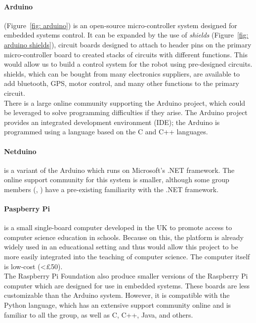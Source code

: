         \paragraph{\gls{Arduino}} (Figure~\ref{fig: arduino}) is an open-source micro-controller system designed for embedded systems control. It can be expanded by the use of \emph{\glspl{shield}} (Figure~\ref{fig: arduino shields}), circuit boards designed to attach to header pins on the primary micro-controller board to created stacks of circuits with different functions. This would allow us to build a control system for the robot using pre-designed circuits. \Glspl{shield}, which can be bought from many electronics suppliers, are available to add bluetooth, GPS, motor control, and many other functions to the primary circuit.\\
        There is a large online community supporting the \gls{Arduino} project, which could be leveraged to solve programming difficulties if they arise. The \gls{Arduino} project provides an integrated development environment (IDE); the \gls{Arduino} is programmed using a language based on the C and C++ languages.
        \paragraph{Netduino} is a variant of the \gls{Arduino} which runs on Microsoft's .NET framework. The online support community for this system is smaller, although some group members (\AG, \LY) have a pre-existing familiarity with the .NET framework.\\

        \paragraph{Paspberry Pi}is a small single-board computer developed in the UK to promote access to computer science education in schools. Because on this, the platform is already widely used in an educational setting and thus would allow this project to be more easily integrated into the teaching of computer science. The computer itself is low-cost (<\pounds{50}).\\
        The Raspberry Pi Foundation also produce smaller versions of the Raspberry Pi computer which are designed for use in embedded systems. These boards are less customizable than the Arduino system. However, it is compatible with the Python language, which has an extensive support community online and is familiar to all the group, as well as C, C++, Java, and others.

